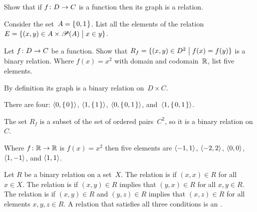 \documentclass{ibl}  %
\begin{document}
\begin{ex}
\begin{exes}
\item Show that if $\mbox{$f\colon D\to C$}$ is a function then 
  its graph is a relation.
\item
  Consider the set~$A=\mbox{$\{\hspace{0.1em}0,1\hspace{0.1em}\}$}$.
  List all the elements of the relation 
  $E=\{(x,y)\in A\times\mathscr{P}(A) \bigm| x\in y\}$.
\item Let $\mbox{$f\colon D\to C$}$ be a function.
  Show that 
  $R_f=\{(x,y)\in D^2 \bigm| f(x)=f(y)\}$
  is a binary relation.
  Where $f(x)=x^2$ with domain and codomain~$\mathbb{R}$,
  list five elements. 
\end{exes}
\begin{ans}
\begin{exes}
\item By definition its graph is a binary relation on~$D\times C$.
\item There are four: $\langle0,\mbox{$\{\hspace{0.1em}0\hspace{0.1em}\}$}\rangle$, 
  $\langle1,\mbox{$\{\hspace{0.1em}1\hspace{0.1em}\}$}\rangle$, $\langle0,\mbox{$\{\hspace{0.1em}0,1\hspace{0.1em}\}$}\rangle$, 
  and~$\langle1,\mbox{$\{\hspace{0.1em}0,1\hspace{0.1em}\}$}\rangle$. 
\item The set $R_f$ is a subset of the set of ordered pairs~$C^2$,
  so it is a binary relation on~$C$.

  Where $\mbox{$f\colon \mathbb{R}\to \mathbb{R}$}$ is $f(x)=x^2$ then five elements are
  $\langle-1,1\rangle$, $\langle-2,2\rangle$, $\langle0,0\rangle$,
  $\langle1,-1\rangle$, and $\langle1,1\rangle$.
\end{exes}
\end{ans}
\end{ex}

\begin{df} 
Let $R$ be a binary relation on a set~$X$.
The relation is  if $(x,x)\in R$ for all $x\in X$.
The relation is  if $(x,y)\in R$ implies that
$(y,x)\in R$ for all $x,y\in R$.
The relation is  if 
$(x,y)\in R$ and $(y,z)\in R$ implies that 
$(x,z)\in R$ for all elements $x,y,z\in R$.
A relation that satisfies all three conditions is an
.  
\end{df}
\end{document}
